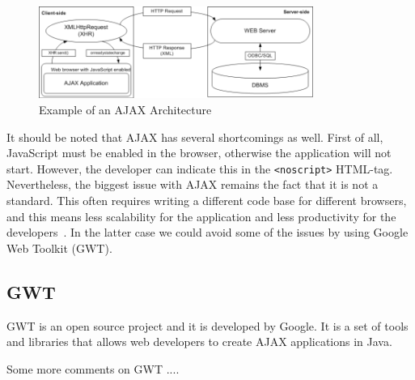 \begin{figure}[h]
	\begin{center}
		\includegraphics[width=0.8\textwidth]{./img/ajax01a.png}
		\caption{Example of an AJAX Architecture}
		\label{fig:ajax01}
	\end{center}
\end{figure}


It should be noted that AJAX has several shortcomings as well. First of all, 
JavaScript must be enabled in the browser, otherwise the application will not start.
However, the developer can indicate this in the \verb=<noscript>= HTML-tag. 
Nevertheless, the biggest issue with AJAX remains the fact that it is not a
standard. This often requires writing a different code base for different
browsers, and this means less scalability for the application and less productivity for
the developers~\cite{bgwt2}. In the latter case we could avoid some of the issues by using 
Google Web Toolkit (GWT).

\subsection{GWT}
\label{sec:gwt}

GWT is an open source project
and it is developed by Google. It is a set of tools and libraries that allows web developers to
create AJAX applications in Java. 

Some more comments on GWT ....

